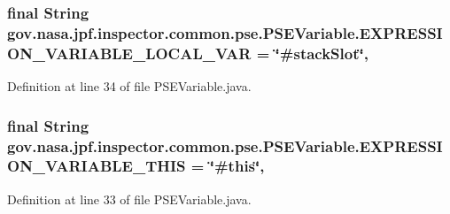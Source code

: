\subsubsection[{\texorpdfstring{E\+X\+P\+R\+E\+S\+S\+I\+O\+N\+\_\+\+V\+A\+R\+I\+A\+B\+L\+E\+\_\+\+L\+O\+C\+A\+L\+\_\+\+V\+AR}{EXPRESSION_VARIABLE_LOCAL_VAR}}]{\setlength{\rightskip}{0pt plus 5cm}final String gov.\+nasa.\+jpf.\+inspector.\+common.\+pse.\+P\+S\+E\+Variable.\+E\+X\+P\+R\+E\+S\+S\+I\+O\+N\+\_\+\+V\+A\+R\+I\+A\+B\+L\+E\+\_\+\+L\+O\+C\+A\+L\+\_\+\+V\+AR = \char`\"{}\#stack\+Slot\char`\"{}\hspace{0.3cm}{\ttfamily [static]}, {\ttfamily [inherited]}}\hypertarget{classgov_1_1nasa_1_1jpf_1_1inspector_1_1common_1_1pse_1_1_p_s_e_variable_a16e15f6de4b00d41b48ba8a53907442d}{}\label{classgov_1_1nasa_1_1jpf_1_1inspector_1_1common_1_1pse_1_1_p_s_e_variable_a16e15f6de4b00d41b48ba8a53907442d}


Definition at line 34 of file P\+S\+E\+Variable.\+java.

\subsubsection[{\texorpdfstring{E\+X\+P\+R\+E\+S\+S\+I\+O\+N\+\_\+\+V\+A\+R\+I\+A\+B\+L\+E\+\_\+\+T\+H\+IS}{EXPRESSION_VARIABLE_THIS}}]{\setlength{\rightskip}{0pt plus 5cm}final String gov.\+nasa.\+jpf.\+inspector.\+common.\+pse.\+P\+S\+E\+Variable.\+E\+X\+P\+R\+E\+S\+S\+I\+O\+N\+\_\+\+V\+A\+R\+I\+A\+B\+L\+E\+\_\+\+T\+H\+IS = \char`\"{}\#this\char`\"{}\hspace{0.3cm}{\ttfamily [static]}, {\ttfamily [inherited]}}\hypertarget{classgov_1_1nasa_1_1jpf_1_1inspector_1_1common_1_1pse_1_1_p_s_e_variable_af8959a7765f3dfb003455c21f541f7f1}{}\label{classgov_1_1nasa_1_1jpf_1_1inspector_1_1common_1_1pse_1_1_p_s_e_variable_af8959a7765f3dfb003455c21f541f7f1}


Definition at line 33 of file P\+S\+E\+Variable.\+java.

